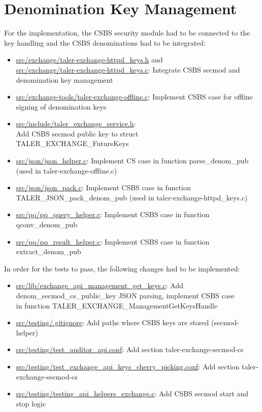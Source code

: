 \section{Denomination Key Management}
For the implementation, the \gls{CSBS} security module had to be connected to the key handling and the \gls{CSBS} denominations had to be integrated:
\begin{itemize}
    \item \url{src/exchange/taler-exchange-httpd_keys.h} and \\
    \url{src/exchange/taler-exchange-httpd_keys.c}: Integrate \gls{CSBS} secmod and denomination key management
    \item \url{src/exchange-tools/taler-exchange-offline.c}: Implement \gls{CSBS} case for offline signing of denomination keys
    \item \url{src/include/taler_exchange_service.h}: \\
    Add \gls{CSBS} secmod public key to struct\\TALER\_EXCHANGE\_FutureKeys
    \item \url{src/json/json_helper.c}: Implement CS case in function parse\_denom\_pub (used in taler-exchange-offline.c)
    \item \url{src/json/json_pack.c}: Implement \gls{CSBS} case in function TALER\_JSON\_pack\_denom\_pub (used in taler-exchange-httpd\_keys.c)
    \item \url{src/pq/pq_query_helper.c}: Implement \gls{CSBS} case in function qconv\_denom\_pub
    \item \url{src/pq/pq_result_helper.c}: Implement \gls{CSBS} case in function extract\_denom\_pub
\end{itemize}

In order for the tests to pass, the following changes had to be implemented:
\begin{itemize}
    \item \url{src/lib/exchange_api_management_get_keys.c}: Add denom\_secmod\_cs\_public\_key JSON parsing, implement \gls{CSBS} case \\in function TALER\_EXCHANGE\_ManagementGetKeysHandle
    \item \url{src/testing/.gitignore}: Add paths where \gls{CSBS} keys are stored (secmod-helper)
    \item \url{src/testing/test_auditor_api.conf}: Add section taler-exchange-secmod-cs
    \item \url{src/testing/test_exchange_api_keys_cherry_picking.conf}: Add section taler-exchange-secmod-cs
    \item \url{src/testing/testing_api_helpers_exchange.c}: Add \gls{CSBS} secmod start and stop logic
\end{itemize}


